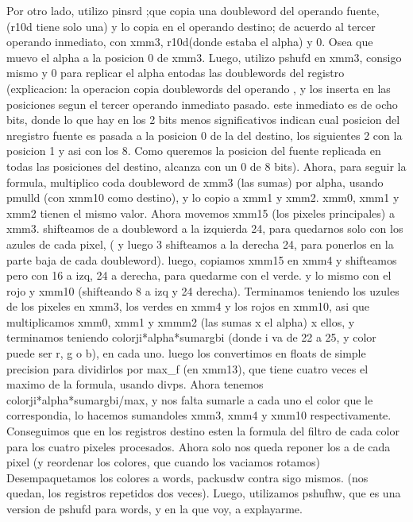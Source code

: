 \documentclass[a4paper]{article}
\begin{document}
Por otro lado, utilizo pinsrd ;que copia una doubleword del operando fuente, (r10d tiene solo una) y lo copia en el operando destino; de acuerdo al tercer operando inmediato,   con xmm3, r10d(donde estaba el alpha) y 0. Osea que muevo el alpha  a la posicion 0 de xmm3.
\hfill \break
Luego, utilizo pshufd en xmm3, consigo mismo y 0 para replicar el alpha entodas las doublewords del registro 
\hfill \break
(explicacion: la operacion copia doublewords del operando , y los inserta en las posiciones   segun el tercer operando inmediato pasado. este inmediato es de ocho bits, donde lo que hay en los 2  bits menos significativos  indican cual posicion del nregistro fuente es pasada a la posicion 0 de la del destino, los siguientes 2 con la posicion 1 y asi con los 8. Como queremos la posicion del fuente replicada en todas las posiciones del destino, alcanza con un 0 de 8 bits).
\hfill \break
Ahora, para seguir la formula, multiplico coda doubleword de xmm3 (las sumas) por alpha, usando pmulld (con xmm10 como destino), y lo copio a xmm1 y xmm2. xmm0, xmm1 y xmm2 tienen el mismo valor.
\hfill \break
Ahora movemos xmm15 (los pixeles principales) a xmm3. shifteamos de a doubleword a la izquierda 24, para quedarnos solo con los azules de cada pixel,  ( y luego 3 shifteamos a la derecha 24, para ponerlos en la parte baja de cada doubleword).  luego, copiamos xmm15 en xmm4 y shifteamos pero con 16 a izq, 24 a derecha, para quedarme con el verde. y lo mismo con el rojo y xmm10 (shifteando 8 a izq y 24 derecha).
\hfill \break
Terminamos  teniendo los uzules de los pixeles en xmm3, los verdes en xmm4 y los rojos en xmm10, asi que multiplicamos xmm0, xmm1 y xmmm2 (las sumas x el alpha) x ellos, y terminamos teniendo colorji*alpha*sumargbi 
(donde i va de 22 a 25, y color puede ser r, g o b), en cada uno.  luego los convertimos en floats de simple precision para dividirlos por max_f (en xmm13), que tiene cuatro veces el maximo de la formula, usando divps.
\hfill \break
Ahora tenemos colorji*alpha*sumargbi/max, y nos falta sumarle a cada uno el color que le correspondia, lo hacemos sumandoles xmm3, xmm4 y xmm10 respectivamente. Conseguimos que en los registros destino esten la formula del filtro de cada color para los cuatro pixeles procesados. 
\hfill \break
Ahora solo nos queda reponer los a de cada pixel (y reordenar los colores, que cuando los vaciamos rotamos) Desempaquetamos los colores a words, packusdw contra sigo mismos. (nos quedan, los registros repetidos dos veces). Luego, utilizamos pshufhw, que es una version de pshufd para words, y en la que voy, a explayarme. 
\end{document}
